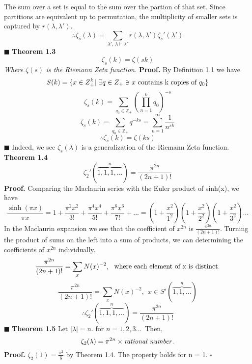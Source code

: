 \documentclass[12pt]{article}
\begin{document}
\newline \newline
The sum over a set is equal to the sum over the partion of that set. Since partitions are equivalent up to permutation, the multiplicity of smaller sets is captured by \(r(\lambda, \lambda')\).
\[\therefore \zeta_s(\lambda) = \sum_{\lambda',\ \lambda \vdash \lambda'} r(\lambda,\lambda')\zeta_s'(\lambda')\]
\(\blacksquare\)
\textbf{Theorem 1.3}
\[\zeta_s(k) = \zeta(sk)\]
\textit{Where }\(\zeta(s)\)\textit{ is the Riemann Zeta function.}
\newline
\textbf{Proof.}
\newline
By Definition 1.1 we have
\[S(k) = \{x\in Z_+^k|\ \exists q \in Z_+ \ni x \textup{ contains k copies of } q_0\}\]
\[\zeta_s(k) = \sum_{q_0 \in \mathbb{Z}_+}\left(\prod_{n=1}^kq_0\right)^{-s}\]
\[\zeta_s(k)=\sum_{q_0\in \mathbb{Z}_+}q^{-ks}=\sum_{n=1}^{\infty}\frac{1}{n^{sk}}\]
\[\therefore \zeta_s(k) = \zeta(ks)\]
\(\blacksquare\) \newline
Indeed, we see \(\zeta_s(\lambda)\) is a generalization of the Riemann Zeta function.
\newline
\textbf{Theorem 1.4}
\[\zeta_2'(\overbrace{1,1,1,...}^n) = \frac{\pi^{2n}}{(2n+1)!}\]
\textbf{Proof.}
\newline
Comparing the Maclaurin series with the Euler product of sinh(x)\cite{gardiner2002understanding}, we have
\[\frac{\sinh(\pi x)}{\pi x} = 1 + \frac{\pi^2x^2}{3!} + \frac{\pi^4x^4}{5!} + \frac{\pi^6x^6}{7!} +...=\left(1+\frac{x^2}{1^2}\right)\left(1+\frac{x^2}{2^2}\right)\left(1+\frac{x^2}{3^2}\right)...\]
In the Maclaurin expansion we see that the coefficient of \(x^{2n}\) is \(\frac{\pi^{2n}}{(2n+1)!}\).
\newline
Turning the product of sums on the left into a sum of products, we can determining the coefficients of \(x^{2n}\) individually.
\[\frac{\pi^{2n}}{(2n+1)!} = \sum_xN(x)^{-2},\ \ \textup{where each element of x is distinct.}\]
\[\frac{\pi^{2n}}{(2n+1)!} = \sum_xN(x)^{-2},\ \ x \in S'(\overbrace{1,1,...}^n)\]
\[\therefore \zeta_2'(\overbrace{1,1,1,...}^n) = \frac{\pi^{2n}}{(2n+1)!}\]
\(\blacksquare\)
\newline
\textbf{Theorem 1.5} Let \(|\lambda| = n\). for \(n = 1,2,3...\)\ Then,
\[\zeta_2(\lambda) = \pi^{2n} \times \textup{\textit{rational number}}.\]
\textbf{Proof.}
\newline
\(\zeta_2(1) = \frac{\pi^2}{6}\) by Theorem 1.4.
\newline
The property holds for n = 1.
\newline \(\square\) \newline
\end{document}
